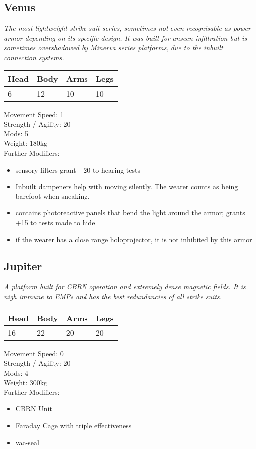 \documentclass[12pt,a4paper,openany]{book}
\begin{document}
\begin{multicols}{2}
	\subsection{Venus}
	\textit{The most lightweight strike suit series, sometimes not even recognisable as power armor depending on its specific design. It was built for unseen infiltration but is sometimes overshadowed by Minerva series platforms, due to the inbuilt connection systems.}\par
	\begin{tabular}{|l|l|l|l|}
		\hline
		Head & Body & Arms & Legs\\
		\hline
		6 & 12 & 10 & 10\\
		\hline
	\end{tabular}
	\par
	Movement Speed: 1\\
	Strength / Agility: 20\\
	Mods: 5\\
	Weight: 180kg\\
	Further Modifiers:
	\vspace{-8mm}
	\begin{itemize}
		\setlength\itemsep{-8mm}
		\item sensory filters grant +20 to hearing tests
		\item Inbuilt dampeners help with moving silently. The wearer counts as being barefoot when sneaking.
		\item contains photoreactive panels that bend the light around the armor; grants +15 to tests made to hide
		\item if the wearer has a close range holoprojector, it is not inhibited by this armor
	\end{itemize}
	\par
	\subsection{Jupiter}
	\textit{A platform built for CBRN operation and extremely dense magnetic fields. It is nigh immune to EMPs and has the best redundancies of all strike suits.}\par
	\begin{tabular}{|l|l|l|l|}
		\hline
		Head & Body & Arms & Legs\\
		\hline
		16 & 22 & 20 & 20\\
		\hline
	\end{tabular}
	\par
	Movement Speed: 0\\
	Strength / Agility: 20\\
	Mods: 4\\
	Weight: 300kg\\
	Further Modifiers:
	\vspace{-8mm}
	\begin{itemize}
		\setlength\itemsep{-8mm}
		\item CBRN Unit
		\item Faraday Cage with triple effectiveness
		\item vac-seal
	\end{itemize}
	\par
	\end{multicols}
\end{document}

